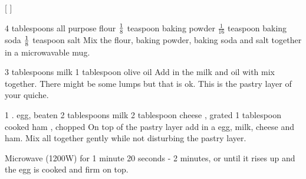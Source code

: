 
[
]

\begin{step}
4 tablespoons all purpose flour
$\frac{1}{8}$ teaspoon baking powder
$\frac{1}{16}$ teaspoon baking soda
$\frac{1}{8}$ teaspoon salt
\method
Mix the flour, baking powder, baking soda and salt together in a microwavable mug.
\end{step}

\begin{step}
3 tablespoons milk
1 tablespoon olive oil
\method
Add in the milk and oil with mix together. There might be some lumps but that is ok. This is the pastry layer of your quiche.
\end{step}

\begin{step}
1 . egg, beaten
2 tablespoons milk
2 tablespoon cheese , grated
1 tablespoon cooked ham , chopped
\method
On top of the pastry layer add in a egg, milk, cheese and ham. Mix all together gently while not disturbing the pastry layer.

Microwave (1200W) for 1 minute 20 seconds - 2 minutes, or until it rises up and the egg is cooked and firm on top.


\end{step}